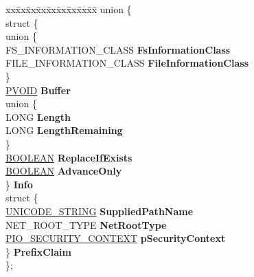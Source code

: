 \begin{DoxyCompactItemize}
\item 
\mbox{\label{struct___r_x___c_o_n_t_e_x_t_aeb83a3ee43579336f3883f7d22c6a5e3}} 
\begin{tabbing}
xx\=xx\=xx\=xx\=xx\=xx\=xx\=xx\=xx\=\kill
union \{\\
\>struct \{\\
\mbox{\label{struct___r_x___c_o_n_t_e_x_t_1_1_0D1783_1_1_0D1791_a6f71ddc86779d07ce842e324b4246be8}} 
\>\>union \{\\
\>\>\>FS\_INFORMATION\_CLASS {\bfseries FsInformationClass}\\
\>\>\>FILE\_INFORMATION\_CLASS {\bfseries FileInformationClass}\\
\>\>\} \\
\>\>\hyperlink{interfacevoid}{PVOID} {\bfseries Buffer}\\
\mbox{\label{struct___r_x___c_o_n_t_e_x_t_1_1_0D1783_1_1_0D1791_adb5836974e9c42a1f0bc93c2bdc3e129}} 
\>\>union \{\\
\>\>\>LONG {\bfseries Length}\\
\>\>\>LONG {\bfseries LengthRemaining}\\
\>\>\} \\
\>\>\hyperlink{_processor_bind_8h_a112e3146cb38b6ee95e64d85842e380a}{BOOLEAN} {\bfseries ReplaceIfExists}\\
\>\>\hyperlink{_processor_bind_8h_a112e3146cb38b6ee95e64d85842e380a}{BOOLEAN} {\bfseries AdvanceOnly}\\
\>\} {\bfseries Info}\\
\>struct \{\\
\>\>\hyperlink{struct___u_n_i_c_o_d_e___s_t_r_i_n_g}{UNICODE\_STRING} {\bfseries SuppliedPathName}\\
\>\>NET\_ROOT\_TYPE {\bfseries NetRootType}\\
\>\>\hyperlink{struct___i_o___s_e_c_u_r_i_t_y___c_o_n_t_e_x_t}{PIO\_SECURITY\_CONTEXT} {\bfseries pSecurityContext}\\
\>\} {\bfseries PrefixClaim}\\
\}; \\


\end{tabbing}
\end{DoxyCompactItemize}

